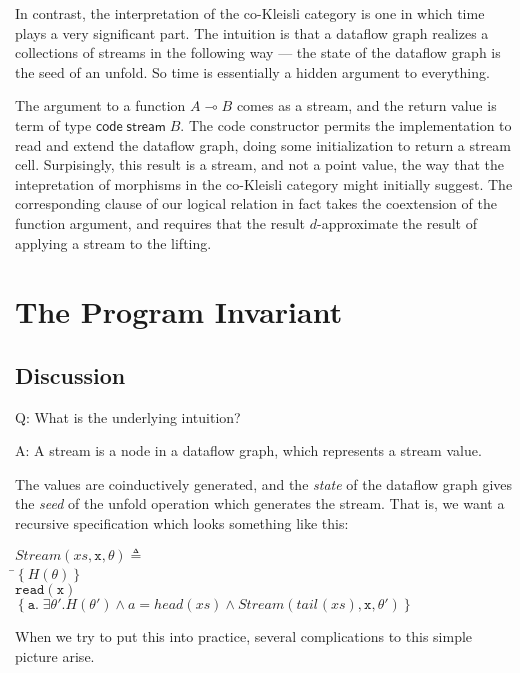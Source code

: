 \documentclass[preprint]{sigplanconf}
\newcommand{\setof}[1]{\left\{{#1}\right\}}
\newcommand{\term}[1]{\ensuremath{\mathtt{{#1}}}}
\newcommand{\comp}[1]{\mathsf{code}\;{#1}}
\newcommand{\streamtype}[1]{\mathsf{stream}\;{#1}}
\newcommand{\lolli}{\multimap}
\newcommand{\head}[1]{\mathit{head}(#1)}
\newcommand{\tail}[2][]{\mathit{tail}^{#1}(#2)}
\begin{document}
In contrast, the interpretation of the co-Kleisli category is one in
which time plays a very significant part. The intuition is that a
dataflow graph realizes a collections of streams in the following way
--- the state of the dataflow graph is the seed of an unfold.  So time
is essentially a hidden argument to everything.

The argument to a function $A \lolli B$ comes as a stream, and the
return value is term of type $\comp{\streamtype{B}}$. The code
constructor permits the implementation to read and extend the dataflow
graph, doing some initialization to return a stream cell. Surpisingly,
this result is a stream, and not a point value, the way that the
intepretation of morphisms in the co-Kleisli category might initially
suggest. The corresponding clause of our logical relation in fact
takes the coextension of the function argument, and requires that the
result $d$-approximate the result of applying a stream to the lifting. 

\section{The Program Invariant}

\subsection{Discussion}

Q: What is the underlying intuition?

\noindent A: A stream is a node in a dataflow graph, which represents
a stream value.

The values are coinductively generated, and the \emph{state} of the
dataflow graph gives the \emph{seed} of the unfold operation which
generates the stream. That is, we want a recursive specification 
which looks something like this: 

\begin{tabbing}
$\mathit{Stream}(xs, \term{x}, \theta) \triangleq$  \\
\;\;\=$\setof{H(\theta)}$  \\
    \>\term{read(x)} \\
    \>$\setof{\term{a}.\;\exists \theta'. H(\theta') \land a = \head{xs} \land 
                           \mathit{Stream}(\tail{xs},\term{x}, \theta')}$ \\
\end{tabbing}

When we try to put this into practice, several complications to this
simple picture arise.
\end{document}
